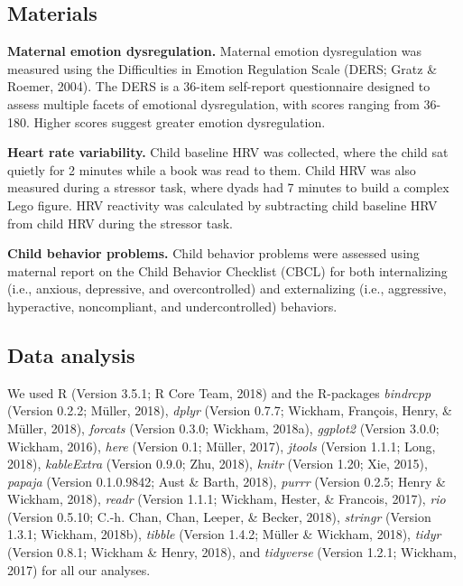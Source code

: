 \documentclass[man]{apa6}
\begin{document}
\subsection{Materials}\label{materials}

\textbf{Maternal emotion dysregulation.} Maternal emotion dysregulation
was measured using the Difficulties in Emotion Regulation Scale (DERS;
Gratz \& Roemer, 2004). The DERS is a 36-item self-report questionnaire
designed to assess multiple facets of emotional dysregulation, with
scores ranging from 36-180. Higher scores suggest greater emotion
dysregulation.

\textbf{Heart rate variability.} Child baseline HRV was collected, where
the child sat quietly for 2 minutes while a book was read to them. Child
HRV was also measured during a stressor task, where dyads had 7 minutes
to build a complex Lego figure. HRV reactivity was calculated by
subtracting child baseline HRV from child HRV during the stressor task.

\textbf{Child behavior problems.} Child behavior problems were assessed
using maternal report on the Child Behavior Checklist (CBCL) for both
internalizing (i.e., anxious, depressive, and overcontrolled) and
externalizing (i.e., aggressive, hyperactive, noncompliant, and
undercontrolled) behaviors.

\subsection{Data analysis}\label{data-analysis}

We used R (Version 3.5.1; R Core Team, 2018) and the R-packages
\emph{bindrcpp} (Version 0.2.2; Müller, 2018), \emph{dplyr} (Version
0.7.7; Wickham, François, Henry, \& Müller, 2018), \emph{forcats}
(Version 0.3.0; Wickham, 2018a), \emph{ggplot2} (Version 3.0.0; Wickham,
2016), \emph{here} (Version 0.1; Müller, 2017), \emph{jtools} (Version
1.1.1; Long, 2018), \emph{kableExtra} (Version 0.9.0; Zhu, 2018),
\emph{knitr} (Version 1.20; Xie, 2015), \emph{papaja} (Version
0.1.0.9842; Aust \& Barth, 2018), \emph{purrr} (Version 0.2.5; Henry \&
Wickham, 2018), \emph{readr} (Version 1.1.1; Wickham, Hester, \&
Francois, 2017), \emph{rio} (Version 0.5.10; C.-h. Chan, Chan, Leeper,
\& Becker, 2018), \emph{stringr} (Version 1.3.1; Wickham, 2018b),
\emph{tibble} (Version 1.4.2; Müller \& Wickham, 2018), \emph{tidyr}
(Version 0.8.1; Wickham \& Henry, 2018), and \emph{tidyverse} (Version
1.2.1; Wickham, 2017) for all our analyses.
\end{document}
